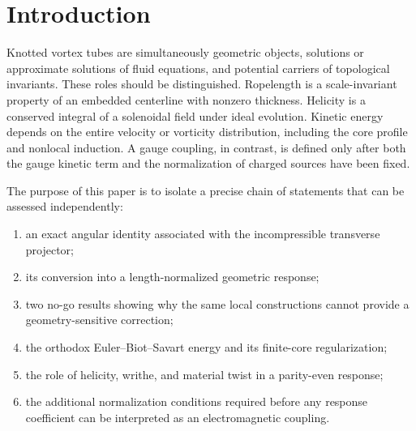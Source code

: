 \documentclass[aps,pre,preprint,notitlepage,nofootinbib,superscriptaddress]{revtex4-2}
\begin{document}
\begin{abstract}
Numerical trefoil data are used only as a convention and provenance test.  The high-resolution radius-normalized ropelength $32.742934477$ is equivalent to the diameter-normalized value $16.3714672385$; a Fourier database value $16.371637$ defines a distinct numerical branch.  Their proximity is strong evidence for scalar ropelength convergence but not for convergence of finite-core response.  Finally, an electromagnetic interpretation is formulated as an explicitly open matching problem: a dimensionless response may be identified with an inverse gauge coupling only after the gauge field and source current have been independently normalized and a genuine $U(1)$ sector with two physical transverse modes has been established.  A calibration and holdout protocol is given that forbids reuse of the target coupling or equivalent calibration data.
\end{abstract}


\maketitle

\section{Introduction}

Knotted vortex tubes are simultaneously geometric objects, solutions or approximate solutions of fluid equations, and potential carriers of topological invariants.  These roles should be distinguished.  Ropelength is a scale-invariant property of an embedded centerline with nonzero thickness.  Helicity is a conserved integral of a solenoidal field under ideal evolution.  Kinetic energy depends on the entire velocity or vorticity distribution, including the core profile and nonlocal induction.  A gauge coupling, in contrast, is defined only after both the gauge kinetic term and the normalization of charged sources have been fixed.

The purpose of this paper is to isolate a precise chain of statements that can be assessed independently:
\begin{enumerate}[label=(\roman*)]
  \item an exact angular identity associated with the incompressible transverse projector;
  \item its conversion into a length-normalized geometric response;
  \item two no-go results showing why the same local constructions cannot provide a geometry-sensitive correction;
  \item the orthodox Euler--Biot--Savart energy and its finite-core regularization;
  \item the role of helicity, writhe, and material twist in a parity-even response;
  \item the additional normalization conditions required before any response coefficient can be interpreted as an electromagnetic coupling.
\end{enumerate}
\end{document}
